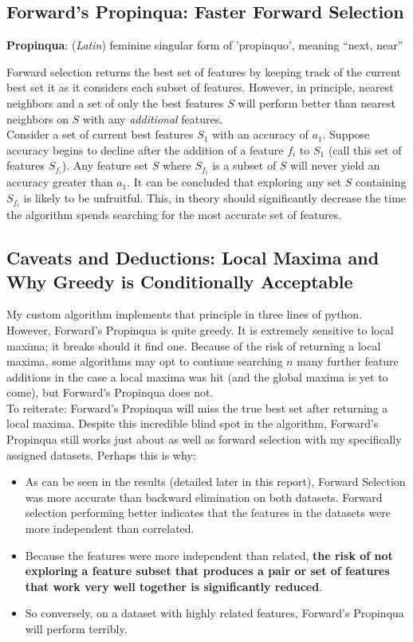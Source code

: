 \documentclass{article}
\begin{document}
\subsection{Forward's Propinqua: Faster Forward Selection}
\textbf{Propinqua}: (\textit{Latin}) feminine singular form of 'propinquo',
meaning ``next, near'' 

Forward selection returns the best set of features by keeping track of the
current best set it as it considers each subset of features. However, in
principle, nearest neighbors and a set of only the best features $S$ will perform
better than nearest neighbors on $S$ with any \textit{additional} features. \\ 

Consider a set of current best features $S_1$ with an accuracy of $a_1$. Suppose
accuracy begins to decline after the addition of a feature $f_i$ to $S_1$ (call
this set of features $S_{f_i}$). Any feature set $S$ where $S_{f_i}$ is a
subset of $S$ will never yield an accuracy greater than $a_1$. It can be concluded
that exploring any set $S$ containing $S_{f_i}$ is likely to be unfruitful.
This, in theory should significantly decrease the time the algorithm spends
searching for the most accurate set of features. \\

\subsection{Caveats and Deductions: Local Maxima and Why Greedy is Conditionally Acceptable}

My custom algorithm implements that principle in three lines of python. However,
Forward's Propinqua is quite greedy. It is extremely sensitive to local maxima; it breaks should it find
one. Because of the risk of returning a local maxima, some algorithms may opt to
continue searching $n$ many further feature additions in the case a local maxima
was hit (and the global maxima is yet to come), but Forward's Propinqua does not. \\

To reiterate: Forward's Propinqua will miss the true best set after returning a
local maxima. Despite this incredible blind spot in the algorithm, Forward's
Propinqua still works just about as well as forward selection with my specifically assigned datasets. Perhaps this is why:
\begin{itemize}
\item As can be seen in the results (detailed later in this report), Forward
  Selection was more accurate than backward elimination on both datasets. Forward selection performing better indicates that the features in the
  datasets were more independent than correlated.
\item Because the features were more independent than related, \textbf{the risk
    of not exploring a feature subset that produces a pair or set of features that work
    very well together is significantly reduced}.
\item So conversely, on a dataset with highly related features, Forward's
  Propinqua will perform terribly.
\end{itemize}
\end{document}
